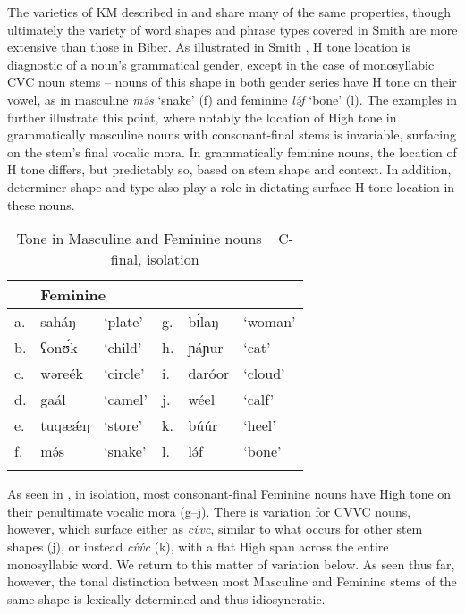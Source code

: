 \documentclass[output=paper,colorlinks,citecolor=brown]{langscibook}
\begin{document}
The varieties of KM described in \citet{Biber1982} and \citet{Smith2022} share many of the same properties, though ultimately the variety of word shapes and phrase types covered in Smith are more extensive than those in Biber. As illustrated in Smith \citeyearpar{Smith2022}, H tone location is diagnostic of a noun's grammatical gender, except in the case of monosyllabic CVC noun stems -- nouns of this shape in both gender series have H tone on their vowel, as in masculine \textit{mə́s} `snake' (f) and feminine \textit{lə́f} `bone' (l). The examples in  further illustrate this point, where notably the location of High tone in grammatically masculine nouns with consonant-final stems is invariable, surfacing on the stem's final vocalic mora. In grammatically feminine nouns, the location of H tone differs, but predictably so, based on stem shape and context. In addition, determiner shape and type also play a role in dictating surface H tone location in these nouns. 

\begin{table}
\caption{Tone in Masculine and Feminine nouns -- C-final, isolation}
\label{tab:MFIsolation}
 \begin{tabular}{llllll}
  \lsptoprule
     \multicolumn{3}{l}{Masculine}  & \multicolumn{3}{l}{Feminine} \\
  \midrule
     a. & saháŋ & `plate' &g. & bɪ́laŋ & `woman' \\
     b. & ʕonʊ́k & `child' &h. & ɲáɲur & `cat' \\
     c. & wəreék & `circle' &i. & daróor & `cloud' \\
     d. & gaál & `camel' & j. & wéel & `calf'\\
     e. & tuqæǽŋ& `store' & k. &  búúr & `heel' \\
     f. & mə́s & `snake' & l. & lə́f & `bone' \\
  \lspbottomrule
 \end{tabular}
\end{table}

As seen in , in isolation, most consonant-final Feminine nouns have High tone on their penultimate vocalic mora (g--j). There is variation for CVVC nouns, however, which surface either as \textit{cv́vc}, similar to what occurs for other stem shapes (j), or instead \textit{cv́v́c}  (k), with a flat High span across the entire monosyllabic word. We return to this matter of variation below. As seen thus far, however, the tonal distinction between most Masculine and Feminine stems of the same shape is lexically determined and thus idiosyncratic. 
\end{document}
